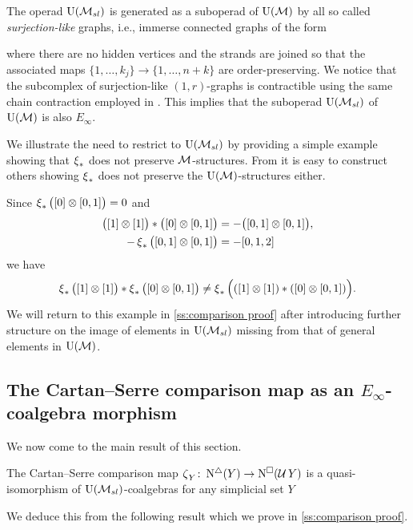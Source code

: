 The operad ${\operatorname{U}(\mathcal{M}_{sl})}$ is generated as a suboperad of ${\operatorname{U}(\mathcal{M})}$ by all so called \textit{surjection-like} graphs, i.e., immerse connected graphs of the form

where there are no hidden vertices and the strands are joined so that the associated maps $\{1, \dots, k_j\} \to \{1, \dots, n+k\}$ are order-preserving.
We notice that the subcomplex of surjection-like $(1,r)$-graphs is contractible using the same chain contraction employed in \cite{medina2020prop1}.
This implies that the suboperad ${\operatorname{U}(\mathcal{M}_{sl})}$ of ${\operatorname{U}(\mathcal{M})}$ is also $E_\infty$.

\begin{example}
	We illustrate the need to restrict to ${\operatorname{U}(\mathcal{M}_{sl})}$ by providing a simple example showing that $\operatorname{\xi}_\ast$ does not preserve $\mathcal{M}$-structures.
	From it is easy to construct others showing $\operatorname{\xi}_\ast$ does not preserve the ${\operatorname{U}(\mathcal{M})}$-structures either.

	Since $\operatorname{\xi}_\ast \big( [0] \otimes [0,1] \big) = 0$ and
	\begin{align*}
	\big( [1] \otimes [1] \big) \ast \big( [0] \otimes [0,1] \big) &=
	- \big( [0,1] \otimes [0,1] \big), \\
	- \operatorname{\xi}_\ast \big( [0,1] \otimes [0,1] \big) & = - [0,1,2]
	\end{align*}
	we have
	\[
	\operatorname{\xi}_\ast \big( [1] \otimes [1] \big) \ast \operatorname{\xi}_\ast \big( [0] \otimes [0,1] \big) \neq \operatorname{\xi}_\ast \Big( ([1] \otimes [1]) \ast ([0] \otimes [0,1]) \Big).
	\]
	We will return to this example in \cref{ss:comparison proof} after introducing further structure on the image of elements in ${\operatorname{U}(\mathcal{M}_{sl})}$ missing from that of general elements in ${\operatorname{U}(\mathcal{M})}$.
\end{example}

\subsection{The Cartan--Serre comparison map as an $E_\infty$-coalgebra morphism} \label{ss:the cartan-serre chain map}

We now come to the main result of this section.

\begin{theorem} \label{t:main comparison}
	The Cartan--Serre comparison map $\operatorname{\zeta}_Y \colon \operatorname{N^{\triangle}}(Y) \to \operatorname{N^{\square}}(\operatorname{\mathcal{U}} Y)$ is a quasi-isomorphism of ${\operatorname{U}(\mathcal{M}_{sl})}$-coalgebras for any simplicial set $Y$
\end{theorem}

We deduce this from the following result which we prove in \cref{ss:comparison proof}.

